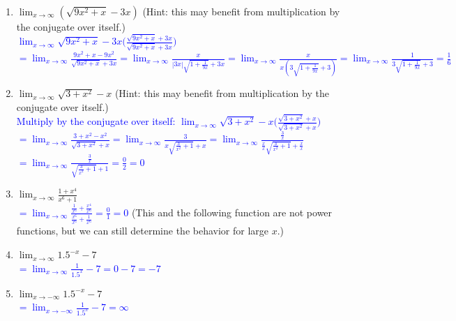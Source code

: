 \documentclass{ximera}
\begin{document}
\begin{exercise}
\begin{enumerate}
    \item $\displaystyle\lim_{x\rightarrow \infty}(\sqrt{9x^2+x}-3x)$ (Hint: this may benefit from multiplication by the conjugate over itself.)\\
    \textcolor{blue}{$\displaystyle \lim_{x\rightarrow \infty}\sqrt{9x^2+x}-3x\bigg(\frac{\sqrt{9x^2+x}+3x}{\sqrt{9x^2+x}+3x}\bigg)$\\
    $=\displaystyle \lim_{x\rightarrow \infty} \frac{9x^2+x-9x^2}{\sqrt{9x^2+x}+3x}=\lim_{x\rightarrow \infty}\frac{x}{|3x| \sqrt{1+\frac{1}{9x}}+3x}=\lim_{x\rightarrow \infty}\frac{x}{x(3\sqrt{1+\frac{1}{9x}}+3)}=\lim_{x\rightarrow \infty}\frac{1}{3\sqrt{1+\frac{1}{9x}}+3}=\frac{1}{6}$}

    \item $\displaystyle \lim_{x\rightarrow \infty} \sqrt{3+x^2}-x$ (Hint: this may benefit from multiplication by the conjugate over itself.)\\
    \textcolor{blue}{Multiply by the conjugate over itself: $\displaystyle \lim_{x\rightarrow \infty}\sqrt{3+x^2}-x\bigg(\frac{\sqrt{3+x^2}+x}{\sqrt{3+x^2}+x}\bigg)$\\
    $=\displaystyle \lim_{x\rightarrow \infty} \frac{3+x^2-x^2}{\sqrt{3+x^2}+x}=\lim_{x\rightarrow \infty}\frac{3}{x\sqrt{\frac{3}{x^2}+1}+x}=\lim_{x\rightarrow \infty}\frac{\frac3x}{\frac{x}{x}\sqrt{\frac{3}{x^2}+1}+\frac{x}{x}}$\\
    $\displaystyle=\lim_{x\rightarrow \infty}\frac{\frac3x}
    {\sqrt{\frac{3}{x^2}+1}+1}=\frac{0}{2}=0$}

    \item $\displaystyle\lim_{x\rightarrow \infty}\frac{1+x^4}{x^6+1}$\\
    \textcolor{blue}{$\displaystyle =\lim_{x\rightarrow \infty}\frac{\frac{1}{x^6}+\frac{x^4}{x^6}}{\frac{x^6}{x^6}+\frac{1}{x^6}}=\frac{0}{1}=0$} (This and the following function are not power functions, but we can still determine the behavior for large $x$.)
    
    
    \item $\displaystyle \lim_{x\rightarrow \infty} 1.5^{-x}-7$\\
    \textcolor{blue}{$\displaystyle =\lim_{x\rightarrow \infty} \frac{1}{1.5^x}-7=0-7=-7$}

    \item $\displaystyle \lim_{x\rightarrow -\infty} 1.5^{-x}-7$\\
    \textcolor{blue}{$\displaystyle =\lim_{x\rightarrow -\infty} \frac{1}{1.5^x}-7=\infty$}

  \end{enumerate}
\end{exercise} 
    
\end{document}
